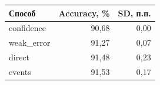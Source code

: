 \begin{tabular}{lrr}
\toprule
Способ & Accuracy, \% & SD, п.п. \\
\midrule
confidence & 90{,}68 & 0{,}00 \\
weak\_error & 91{,}27 & 0{,}07 \\
direct & 91{,}48 & 0{,}23 \\
events & 91{,}53 & 0{,}17 \\
\bottomrule
\end{tabular}
